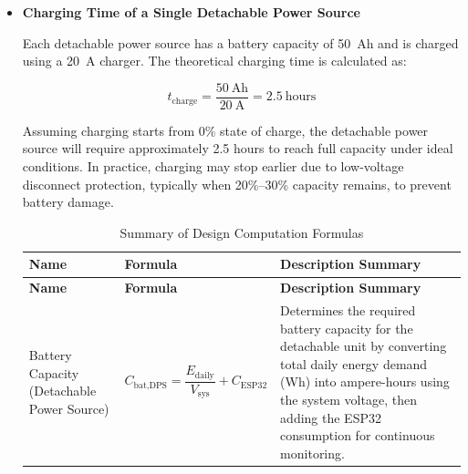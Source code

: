 {\begin{itemize}
 \begin{equation}
 	\eta_{\text{total}} = 0.88 \times 0.88 = 0.7744 \approx 77\%
 \end{equation}
 
 Taking these losses into account, the actual energy required from the station battery to fully charge both detachable power sources is:
 
 \begin{equation}
 	E_{\text{required}} = \frac{E_{\text{target}}}{\eta_{\text{total}}}
 	= \frac{1200~\text{Wh}}{0.7744}
 	\approx 1550.9~\text{Wh}
 \end{equation}
 
 This indicates that while the station battery can theoretically charge both detachable power sources, additional energy from the solar panel or partial charging strategies may be required in practical operation.
 
  	\item\textbf{Charging Time of a Single Detachable Power Source} 
 
 Each detachable power source has a battery capacity of 50~Ah and is charged using a 20~A charger. The theoretical charging time is calculated as:
 
 \begin{equation}
 	t_{\text{charge}} = \frac{50~\text{Ah}}{20~\text{A}} = 2.5~\text{hours}
 \end{equation}
 
 Assuming charging starts from 0\% state of charge, the detachable power source will require approximately 2.5 hours to reach full capacity under ideal conditions. In practice, charging may stop earlier due to low-voltage disconnect protection, typically when 20\%--30\% capacity remains, to prevent battery damage.
 
 \begin{longtable}{|p{3.1cm}|p{5.0cm}|p{4cm}|}
 	\caption{Summary of Design Computation Formulas}\label{tab:design_formulas}\\
 	\hline
 	\textbf{Name} & \textbf{Formula} & \textbf{Description Summary} \\
 	\hline
 	\endfirsthead
 	
 	\hline
 	\textbf{Name} & \textbf{Formula} & \textbf{Description Summary} \\
 	\hline
 	\endhead
 	
 	\hline
 	\endfoot
 	
 	Battery Capacity (Detachable Power Source)
 	&
 	$C_{\text{bat,DPS}}=\dfrac{E_{\text{daily}}}{V_{\text{sys}}}+C_{\text{ESP32}}$
 	&
 	Determines the required battery capacity for the detachable unit by converting total daily energy demand (Wh) into ampere-hours using the system voltage, then adding the ESP32 consumption for continuous monitoring. \\
 	\hline
 	

\end{longtable}
\end{itemize}}
